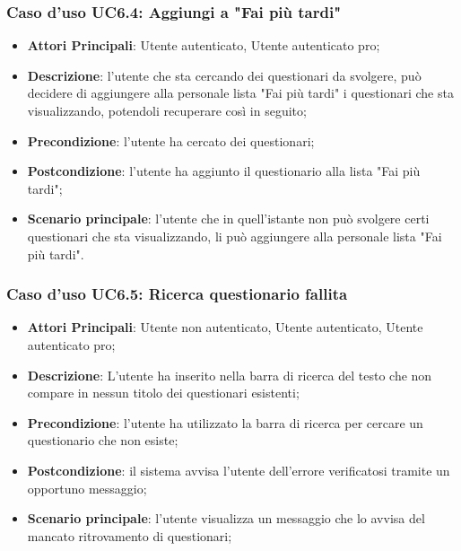 \subsubsection{Caso d'uso UC6.4: Aggiungi a "Fai più tardi"}
\begin{itemize}
\item\textbf{Attori Principali}: Utente autenticato, Utente autenticato pro;
\item\textbf{Descrizione}: l'utente che sta cercando dei questionari da svolgere, può decidere di aggiungere alla personale lista "Fai più tardi" i questionari che sta visualizzando, potendoli recuperare così in seguito;
\item\textbf{Precondizione}: l'utente ha cercato dei questionari;
\item\textbf{Postcondizione}: l'utente ha aggiunto il questionario alla lista "Fai più tardi";
\item\textbf{Scenario principale}: l'utente che in quell'istante non può svolgere certi questionari che sta visualizzando, li può aggiungere alla personale lista "Fai più tardi".
\end{itemize}

\subsubsection{Caso d'uso UC6.5: Ricerca questionario fallita}
\begin{itemize}
\item\textbf{Attori Principali}: Utente non autenticato, Utente autenticato, Utente autenticato pro;
\item\textbf{Descrizione}: L'utente ha inserito nella barra di ricerca del testo che non compare in nessun titolo dei questionari esistenti;
\item\textbf{Precondizione}: l'utente ha utilizzato la barra di ricerca per cercare un questionario che non esiste;
\item\textbf{Postcondizione}: il sistema avvisa l'utente dell'errore verificatosi tramite un opportuno messaggio;
\item\textbf{Scenario principale}: l'utente visualizza un messaggio che lo avvisa del mancato ritrovamento di questionari;
\end{itemize}